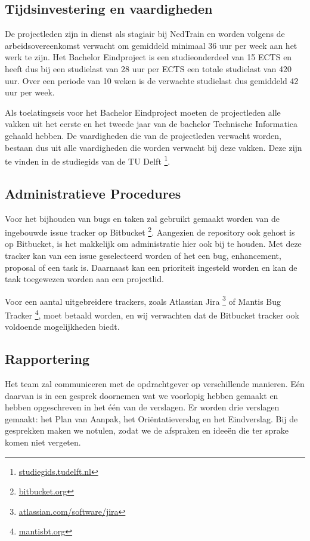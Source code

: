 \subsection{Tijdsinvestering en vaardigheden}
De projectleden zijn in dienst als stagiair bij NedTrain en worden volgens de arbeidsovereenkomst verwacht om gemiddeld minimaal 36 uur per week aan het werk te zijn. Het Bachelor Eindproject is een studieonderdeel van 15 ECTS en heeft dus bij een studielast van 28 uur per ECTS een totale studielast van 420 uur. Over een periode van 10 weken is de verwachte studielast dus gemiddeld 42 uur per week.

Als toelatingseis voor het Bachelor Eindproject moeten de projectleden alle vakken uit het eerste en het tweede jaar van de bachelor Technische Informatica gehaald hebben. De vaardigheden die van de projectleden verwacht worden, bestaan dus uit alle vaardigheden die worden verwacht bij deze vakken. Deze zijn te vinden in de studiegids van de TU Delft \footnote{\url{studiegids.tudelft.nl}}.

\subsection{Administratieve Procedures}
Voor het bijhouden van bugs en taken zal gebruikt gemaakt worden van de ingebouwde issue tracker op Bitbucket \footnote{\url{bitbucket.org}}. Aangezien de repository ook gehost is op Bitbucket, is het makkelijk om administratie hier ook bij te houden. Met deze tracker kan van een issue geselecteerd worden of het een bug, enhancement, proposal of een task is. Daarnaast kan een prioriteit ingesteld worden en kan de taak toegewezen worden aan een projectlid.

Voor een aantal uitgebreidere trackers, zoals Atlassian Jira \footnote{\url{atlassian.com/software/jira}} of Mantis Bug Tracker \footnote{\url{mantisbt.org}}, moet betaald worden, en wij verwachten dat de Bitbucket tracker ook voldoende mogelijkheden biedt.

\subsection{Rapportering}
Het team zal communiceren met de opdrachtgever op verschillende manieren. E\'en daarvan is in een gesprek doornemen wat we voorlopig hebben gemaakt en hebben opgeschreven in het \'e\'en van de verslagen. Er worden drie verslagen gemaakt: het Plan van Aanpak, het Ori\"entatieverslag en het Eindverslag. Bij de gesprekken maken we notulen, zodat we de afspraken en idee\"en die ter sprake komen niet vergeten.

